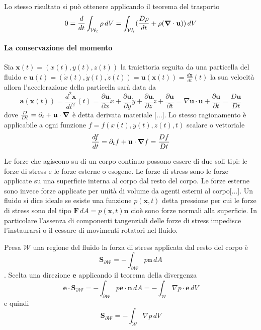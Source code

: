 Lo stesso risultato si può ottenere applicando il teorema del trasporto
\begin{equation}
0 = \frac{d}{dt}\int_{\mathcal{W}_t}\rho\,dV = \int_{\mathcal{W}_t}(\frac{D\rho}{dt}+\rho(\boldsymbol{\nabla}\cdot\mathbf{u}))\,dV
\end{equation}


\paragraph{La conservazione del momento}
Sia $\mathbf{x}(t) = (x(t),y(t),z(t))$ la traiettoria seguita da una particella del fluido e $\mathbf{u}(t) = (\dot{x}(t),\dot{y}(t),\dot{z}(t)) = \mathbf{u}(\mathbf{x}(t)) = \frac{d\mathbf{x}}{dt}(t)$ la sua velocità allora l'accelerazione della particella sarà data da
\begin{equation*} 
\mathbf{a}(\mathbf{x}(t)) = \frac{d^2\mathbf{x}}{dt^2} (t) = \frac{\partial  \mathbf{u}}{\partial x}\dot{x} + \frac{\partial  \mathbf{u}}{\partial y}\dot{y} + \frac{\partial  \mathbf{u}}{\partial z}\dot{z} + \frac{\partial \mathbf{u}}{\partial t}
= \nabla  \mathbf{u} \cdot  \mathbf{u} + \frac{\partial \mathbf{u}}{\partial t} = \frac{D \mathbf{u}}{Dt}
\end{equation*}
dove $\frac{D}{Dt}=\partial_t + \mathbf{u}\cdot\boldsymbol{\nabla}$ è detta derivata materiale [...].
Lo stesso ragionamento è applicabile a ogni funzione $f=f(x(t),y(t),z(t),t)$ scalare o vettoriale
\begin{equation*}
\frac{df}{dt}=\partial_tf+\mathbf{u}\cdot\boldsymbol{\nabla} f = \frac{Df}{Dt}
\end{equation*}

Le forze che agiscono su di un corpo continuo possono essere di due soli tipi: le forze di stress e le forze esterne o esogene. Le forze di stress sono le forze applicate su una superficie interna al corpo dal resto del corpo. Le forze esterne sono invece forze applicate per unità di volume da agenti esterni al corpo[...]. Un fluido si dice ideale se esiste una funzione $p(\mathbf{x},t)$ detta pressione per cui le forze di stress sono del tipo $\mathbf{F}\,dA = p(\mathbf{x},t)\mathbf{n}$ cioè sono forze normali alla superficie. In particolare l'assenza di componenti tangenziali delle forze di stress impedisce l'instaurarsi o il cessare di movimenti rotatori nel fluido.

Presa $\mathcal{W}$ una regione del fluido la forza di stress applicata dal resto del corpo è
$$\mathbf{S}_{\partial\mathcal{W}} = - \int_{\partial\mathcal{W}} p\mathbf{n}\,dA$$.
Scelta una direzione $\mathbf{e}$ applicando il teorema della divergenza
$$\mathbf{e}\cdot\mathbf{S}_{\partial\mathcal{W}} = - \int_{\partial\mathcal{W}} p\mathbf{e}\cdot\mathbf{n}\,dA
                                                  = - \int_{\mathcal{W}} \nabla p \cdot \mathbf{e} \, dV $$
e quindi
$$\mathbf{S}_{\partial\mathcal{W}} = - \int_{\mathcal{W}} \nabla p \, dV $$

